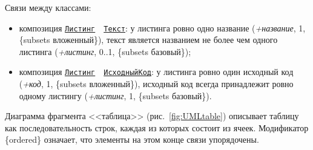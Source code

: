Связи между классами:
\begin{itemize}
	\item композиция \hyperref[fig:UMLlst]{\Verb|Листинг|}~~\hyperref[fig:UMLpic]{\Verb|Текст|}: у листинга ровно одно название (\textit{+название}, 1, \{subsets вложенный\}), текст является названием не более чем одного листинга (\textit{+листинг}, 0..1, \{subsets базовый\});
	\item композиция \hyperref[fig:UMLlst]{\Verb|Листинг|}~~\hyperref[fig:UMLlst]{\Verb|ИсходныйКод|}: у листинга ровно один исходный код (\textit{+код}, 1, \{subsets вложенный\}), исходный код всегда принадлежит ровно одному листингу (\textit{+листинг}, 1, \{subsets базовый\}).
\end{itemize}

Диаграмма фрагмента <<таблица>> (рис.~\ref{fig:UMLtable}) описывает таблицу как последовательность строк, каждая из которых состоит из ячеек. Модификатор \{ordered\} означает, что элементы на этом конце связи упорядочены.

